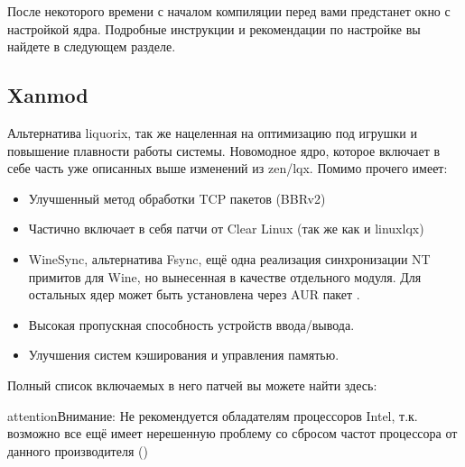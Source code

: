 \documentclass[letterpaper,10pt,russian,openany]{sphinxmanual}
\begin{document}
\sphinxAtStartPar
После некоторого времени с началом компиляции перед вами предстанет окно с настройкой ядра.
Подробные инструкции и рекомендации по настройке вы найдете в следующем разделе.

\noindent{}

\ignorespaces 

\subsection{Xanmod}
\label{\detokenize{source/custom-kernels:xanmod}}\label{\detokenize{source/custom-kernels:linux-xanmod}}\label{\detokenize{source/custom-kernels:index-3}}
\sphinxAtStartPar
Альтернатива liquorix, так же нацеленная на оптимизацию под игрушки и повышение плавности работы системы.
Новомодное ядро, которое включает в себе часть уже описанных выше изменений из zen/lqx. Помимо прочего имеет:
\begin{itemize}
\item {} 
\sphinxAtStartPar
Улучшенный метод обработки TCP пакетов (BBRv2)

\item {} 
\sphinxAtStartPar
Частично включает в себя патчи от Clear Linux (так же как и linux\sphinxhyphen{}lqx)

\item {} 
\sphinxAtStartPar
WineSync, альтернатива Fsync, ещё одна реализация синхронизации NT примитов для Wine, но вынесенная в качестве отдельного модуля.
Для остальных ядер может быть установлена через AUR пакет .

\item {} 
\sphinxAtStartPar
Высокая пропускная способность устройств ввода/вывода.

\item {} 
\sphinxAtStartPar
Улучшения систем кэширования и управления памятью.

\end{itemize}

\sphinxAtStartPar
Полный список включаемых в него патчей вы можете найти здесь: 

\begin{sphinxadmonition}{attention}{Внимание:}
\sphinxAtStartPar
Не рекомендуется обладателям процессоров Intel, т.к. возможно все ещё имеет нерешенную проблему со сбросом частот процессора от данного производителя ()
\end{sphinxadmonition}
\end{document}
